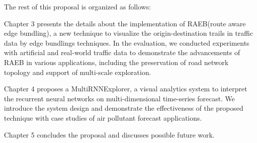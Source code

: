 The rest of this proposal is organized as follows:


Chapter 3 presents the details about the implementation of RAEB(route aware edge bundling), a new technique to visualize the origin-destination trails in traffic data by edge bundlings techniques. In the evaluation, we conducted experiments with artificial and real-world traffic data to demonstrate the advancements of RAEB in various applications, including the preservation of road network topology and support of multi-scale exploration. 

Chapter 4 proposes a MultiRNNExplorer, a visual analytics system to interpret the recurrent neural networks on multi-dimensional time-series forecast. We introduce the system design and demonstrate the effectiveness of the proposed technique with case studies of air pollutant forecast applications.


Chapter 5 concludes the proposal and discusses possible future work.